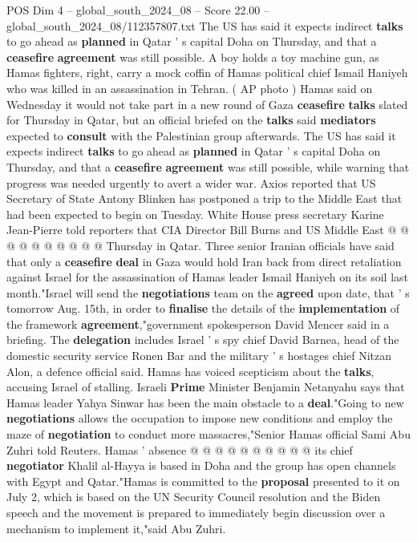 \begin{textsample}{POS Dim 4 – global\_south\_2024\_08 – Score 22.00 – global\_south\_2024\_08/112357807.txt}  \label{ex:f4_pos_130}
The US has said it expects indirect \textbf{talks} to go ahead as \textbf{planned} in Qatar ' s capital Doha on Thursday, and that a \textbf{ceasefire} \textbf{agreement} was still possible.
A boy holds a toy machine gun, as Hamas fighters, right, carry a mock coffin of Hamas political chief Ismail Haniyeh who was killed in an assassination in Tehran. ( AP photo ) Hamas said on Wednesday it would not take part in a new round of Gaza \textbf{ceasefire} \textbf{talks} slated for Thursday in Qatar, but an official briefed on the \textbf{talks} said \textbf{mediators} expected to \textbf{consult} with the Palestinian group afterwards.
The US has said it expects indirect \textbf{talks} to go ahead as \textbf{planned} in Qatar ' s capital Doha on Thursday, and that a \textbf{ceasefire} \textbf{agreement} was still possible, while warning that progress was needed urgently to avert a wider war.
Axios reported that US Secretary of State Antony Blinken has postponed a trip to the Middle East that had been expected to begin on Tuesday.
White House press secretary Karine Jean-Pierre told reporters that CIA Director Bill Burns and US Middle East @ @ @ @ @ @ @ @ @ @ Thursday in Qatar.
Three senior Iranian officials have said that only a \textbf{ceasefire} \textbf{deal} in Gaza would hold Iran back from direct retaliation against Israel for the assassination of Hamas leader Ismail Haniyeh on its soil last month."Israel will send the \textbf{negotiations} team on the \textbf{agreed} upon date, that ' s tomorrow Aug. 15th, in order to \textbf{finalise} the details of the \textbf{implementation} of the framework \textbf{agreement},"government spokesperson David Mencer said in a briefing.
The \textbf{delegation} includes Israel ' s spy chief David Barnea, head of the domestic security service Ronen Bar and the military ' s hostages chief Nitzan Alon, a defence official said.
Hamas has voiced scepticism about the \textbf{talks}, accusing Israel of stalling.
Israeli \textbf{Prime} Minister Benjamin Netanyahu says that Hamas leader Yahya Sinwar has been the main obstacle to a \textbf{deal}."Going to new \textbf{negotiations} allows the occupation to impose new conditions and employ the maze of \textbf{negotiation} to conduct more massacres,"Senior Hamas official Sami Abu Zuhri told Reuters.
Hamas ' absence @ @ @ @ @ @ @ @ @ @ its chief \textbf{negotiator} Khalil al-Hayya is based in Doha and the group has open channels with Egypt and Qatar."Hamas is committed to the \textbf{proposal} presented to it on July 2, which is based on the UN Security Council resolution and the Biden speech and the movement is prepared to immediately begin discussion over a mechanism to implement it,"said Abu Zuhri.

\end{textsample}
